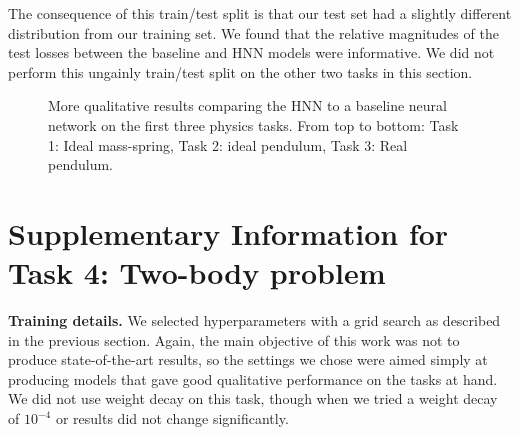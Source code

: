 \documentclass{article}
\begin{document}
The consequence of this train/test split is that our test set had a slightly different distribution from our training set. We found that the relative magnitudes of the test losses between the baseline and HNN models were informative. We did not perform this ungainly train/test split on the other two tasks in this section.

\begin{figure}[H]
\centering
{}
\caption{ More qualitative results comparing the HNN to a baseline neural network on the first three physics tasks. From top to bottom: Task 1: Ideal mass-spring, Task 2: ideal pendulum, Task 3: Real pendulum.}
\end{figure}

\section{Supplementary Information for Task 4: Two-body problem} \label{appendix:orbits}

\textbf{Training details.} We selected hyperparameters with a grid search as described in the previous section. Again, the main objective of this work was not to produce state-of-the-art results, so the settings we chose were aimed simply at producing models that gave good qualitative performance on the tasks at hand. We did not use weight decay on this task, though when we tried a weight decay of $10^{-4}$ or results did not change significantly.
\end{document}

